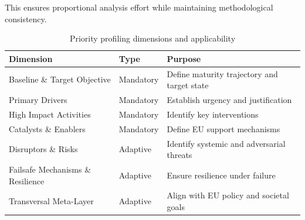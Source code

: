\documentclass{ieeeaccess}
\begin{document}
This ensures proportional analysis effort while maintaining methodological consistency.

\begin{table}[!t]
\centering
\caption{Priority profiling dimensions and applicability}
\begin{tabular}{p{5cm} p{3cm} p{6cm}}
\toprule
\textbf{Dimension} & \textbf{Type} & \textbf{Purpose} \\
\midrule
Baseline \& Target Objective & Mandatory & Define maturity trajectory and target state \\
Primary Drivers & Mandatory & Establish urgency and justification \\
High Impact Activities & Mandatory & Identify key interventions \\
Catalysts \& Enablers & Mandatory & Define EU support mechanisms \\
Disruptors \& Risks & Adaptive & Identify systemic and adversarial threats \\
Failsafe Mechanisms \& Resilience & Adaptive & Ensure resilience under failure \\
Transversal Meta-Layer & Adaptive & Align with EU policy and societal goals \\
\bottomrule
\end{tabular}
\end{table}
\end{document}
